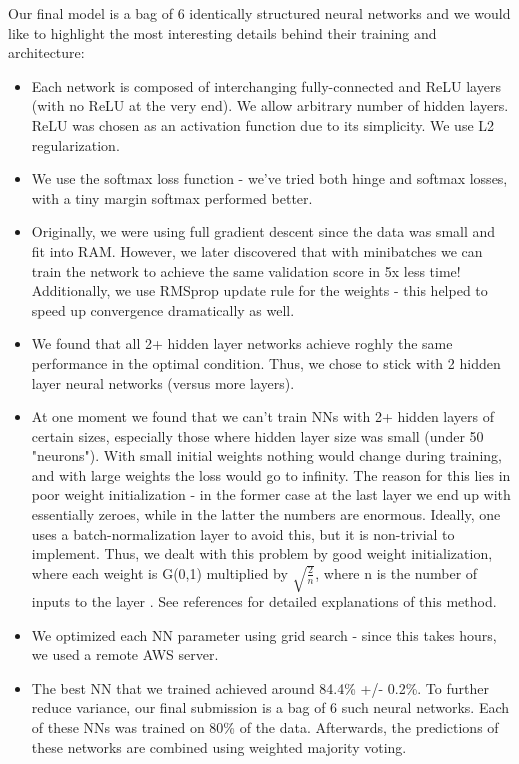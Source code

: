 \documentclass[10pt,conference,compsocconf]{IEEEtran}
\begin{document}
Our final model is a bag of 6 identically structured neural networks and we would like to highlight the most interesting details behind their training and architecture:
\begin{itemize}
\item Each network is composed of interchanging fully-connected and ReLU \cite{relu} layers (with no ReLU at the very end). We allow arbitrary number of hidden layers. ReLU was chosen as an activation function due to its simplicity. We use L2 regularization.
\item We use the softmax \cite{softmax} loss function - we've tried both hinge and softmax losses, with a tiny margin softmax performed better.
\item Originally, we were using full gradient descent since the data was small and fit into RAM. However, we later discovered that with minibatches we can train the network to achieve the same validation score in 5x less time! Additionally, we use RMSprop \cite{rmsprop} update rule for the weights - this helped to speed up convergence dramatically as well.
\item We found that all 2+ hidden layer networks achieve roghly the same performance in the optimal condition. Thus, we chose to stick with 2 hidden layer neural networks (versus more layers).
\item At one moment we found that we can't train NNs with 2+ hidden layers of certain sizes, especially those where hidden layer size was small (under 50 "neurons"). With small initial weights nothing would change during training, and with large weights the loss would go to infinity. The reason for this lies in poor weight initialization - in the former case at the last layer we end up with essentially zeroes, while in the latter the numbers are enormous. Ideally, one uses a batch-normalization layer to avoid this, but it is non-trivial to implement. Thus, we dealt with this problem by good weight initialization, where each weight is G(0,1) multiplied by $\sqrt{\frac{2}{n}}$, where n is the number of inputs to the layer \cite{calibratin_variance_blog} \cite{calibrating_variance_paper}. See references for detailed explanations of this method.
\item We optimized each NN parameter using grid search - since this takes hours, we used a remote AWS server.
\item The best NN that we trained achieved around 84.4\% +/- 0.2\%. To further reduce variance, our final submission is a bag of 6 such neural networks. Each of these NNs was trained on 80\% of the data. Afterwards, the predictions of these networks are combined using weighted majority voting.
\end{itemize}
\end{document}
